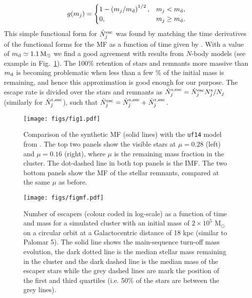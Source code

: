 \documentclass[useAMS,usenatbib,fleqn]{mnras}
\newcommand{\msun}{{\rm M}_\odot}
\newcommand{\comm}[1]{#1}
\def\md{m_{\rm d}}
\newcommand{\nj}{N_j}
\newcommand{\njs}{N_j^{\rm s}}
\newcommand{\njescdot}{\dot{N}_j^{\rm  esc}}
\newcommand{\njsescdot}{\dot{N}_j^{\rm s, esc}}
\newcommand{\njrescdot}{\dot{N}_j^{\rm r, esc}}
\begin{document}
\begin{align}
g(m_j)  = 
\begin{cases}
1  - \left(m_j/\md\right)^{1/2} , &m_j<\md,\\
0,                              &m_j\ge \md.
\end{cases}
\end{align}
This simple functional form for $\njescdot$ was found by matching the time
derivatives of the functional forms for the MF as a function of time given by
\cite{Lamers13}. With a value of $\md\simeq1.1\,\msun$ we find a good
agreement with results from $N$-body models (see example in Fig.~\ref{fig1}).
The 100\% retention of stars and remnants more massive than $\md$ is 
becoming problematic when less than a few \% of the initial mass is remaining,
and hence this approximation is good enough for our purpose. The escape rate is
divided over the stars and remnants as $\njsescdot = \njescdot \njs/\nj$
(similarly for $\njrescdot$), such that $\njescdot = \njsescdot + \njrescdot$.



\begin{figure}
\centering
\texttt{[image: figs/fig1.pdf]}
    \caption{Comparison of the synthetic MF (solid lines) with the \texttt{uf14}
    model from \citet{Lamers13}. The top two panels show the visible stars at
    $\mu=0.28$ (left) and $\mu=0.16$ (right), \comm{where $\mu$ is the remaining
    mass fraction in the cluster.} The dot-dashed line in both top panels is the
    IMF. The two bottom panels show the MF of the stellar remnants, compared at
    the same $\mu$ as before.}
\label{fig1}
\end{figure}

\begin{figure}
\centering
\texttt{[image: figs/figmf.pdf]}
    \caption{Number of escapers (colour coded in log-scale) as a function of
    time and mass for a simulated cluster with an initial mass of $2\times10^5$
    M$_{\odot}$ on a circular orbit at a Galactocentric distance of 18 kpc
    (similar to Palomar 5). The solid line shows the main-sequence turn-off mass
    evolution, the dark dotted line is the median stellar mass remaining in the
    cluster and the dark dashed line is the median mass of the escaper stars
    while the grey dashed lines are mark the position of the first and third
    quartiles (i.e. 50\% of the stars are between the grey lines).}
\label{fig_heat}
\end{figure}
\end{document}
